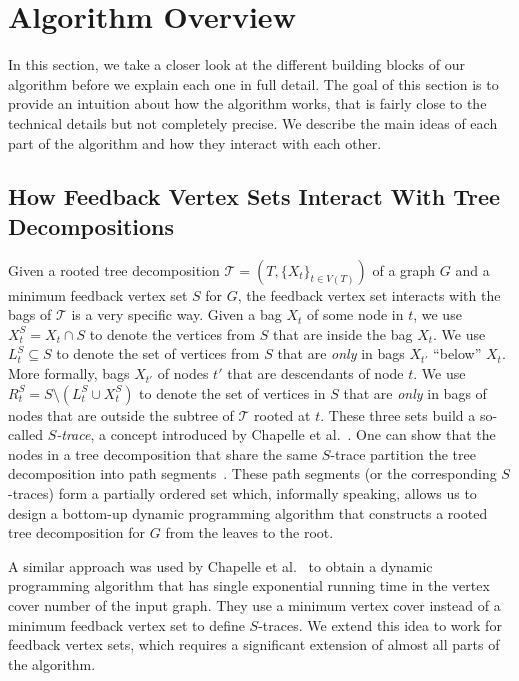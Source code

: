 \documentclass[a4paper,UKenglish,cleveref, autoref, thm-restate, numberwithinsect]{lipics-v2021}
\newcounter{algorithm}
\begin{document}
\section{Algorithm Overview}\label{sec:overview}
In this section, we take a closer look at the different building blocks of our algorithm before we explain each one in full detail. The goal of this section is to provide an intuition about how the algorithm works, that is fairly close to the technical details but not completely precise. We describe the main ideas of each part of the algorithm and how they interact with each other.

\subsection{How Feedback Vertex Sets Interact With Tree Decompositions}
Given a rooted tree decomposition $\mathcal{T}=(T,\{X_t\}_{t\in V(T)})$ of a graph $G$ and a minimum feedback vertex set $S$ for $G$, the feedback vertex set interacts with the bags of $\mathcal{T}$ is a very specific way. 
Given a bag $X_t$ of some node in $t$, we use $X_t^S=X_t\cap S$ to denote the vertices from $S$ that are inside the bag $X_t$. We use $L^S_t\subseteq S$ to denote the set of vertices from $S$ that are \emph{only} in bags $X_{t'}$ ``below'' $X_t$. More formally, bags $X_{t'}$ of nodes $t'$ that are descendants of node $t$. We use $R^S_t = S\setminus (L^S_t\cup X^S_t)$ to denote the set of vertices in $S$ that are \emph{only} in bags of nodes that are outside the subtree of $\mathcal{T}$ rooted at $t$. 
These three sets build a so-called \emph{$S$-trace}, a concept introduced by Chapelle et al.~\cite{chapelle2017treewidth}.
One can show that the nodes in a tree decomposition that share the same $S$-trace partition the tree decomposition into path segments~\cite{chapelle2017treewidth}.
These path segments (or the corresponding $S$-traces) form a partially ordered set which, informally speaking, allows us to design a bottom-up dynamic programming algorithm that constructs a rooted tree decomposition for $G$ from the leaves to the root. 

A similar approach was used by Chapelle et al.~\cite{chapelle2017treewidth} to obtain a dynamic programming algorithm that has single exponential running time in the vertex cover number of the input graph. They use a minimum vertex cover instead of a minimum feedback vertex set to define $S$-traces. We extend this idea to work for feedback vertex sets, which requires a significant extension of almost all parts of the algorithm.
\end{document}
